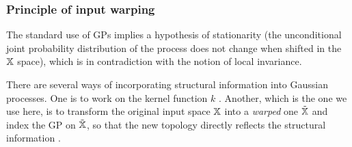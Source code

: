 %  
% 
% 
%  
% 
% 
% 

\subsubsection{Principle of input warping}
The standard use of GPs implies a hypothesis of stationarity (the unconditional joint probability distribution of the process does not change when shifted in the $\mathbb{X}$ space),
which is in contradiction with the notion of local invariance. 

There are several ways of incorporating structural information into Gaussian processes. 
One is to work on the kernel function $k$ \cite{ginsbourger2013kernels,duvenaud2014automatic}.
Another, which is the one we use here, is to transform the original input space $\mathbb{X}$ into a \textit{warped} one $\tilde {\mathbb{X}}$ 
and index the GP on $\tilde {\mathbb{X}}$, so that the new topology directly reflects the structural information \cite{snoek2014input,marmin2018warped}.

